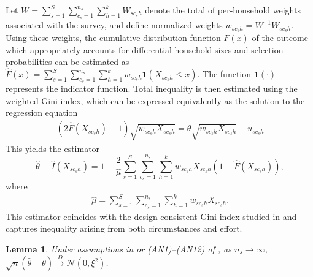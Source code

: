 \documentclass[12pt]{article}
\theoremstyle{plain}
\newtheorem{lemma}{Lemma}
\theoremstyle{definition}
\begin{document}
Let $W=\sum_{s=1}^{S}\sum_{c_s=1}^{n_s}\sum_{h=1}^{k}W_{sc_sh}$
denote the total of per-household weights associated with the survey, and define normalized weights $w_{sc_sh}=W^{-1}W_{sc_sh}$. Using these weights, the cumulative distribution function $F(x)$ of the outcome which appropriately accounts for differential household sizes and selection probabilities can be estimated as $\hat{F}\left(x\right) = \sum_{s=1}^{S} \sum_{c_s=1}^{n_s} \sum_{h=1}^{k}
w_{sc_sh}\mathbf{1}\left(X_{sc_sh}\leq x\right)$. The function $\mathbf{1}(\cdot)$ represents the indicator function.
Total inequality is then estimated using the weighted Gini index, which can be expressed equivalently as the solution to the regression equation
\begin{align}
    (2\hat{F}(X_{sc_sh})-1)\sqrt{w_{sc_sh}X_{sc_sh}}=\theta \sqrt{w_{sc_sh}X_{sc_sh}}+u_{sc_sh}
\end{align}
This yields the estimator
\begin{equation}
\hat{\theta}\equiv \hat{I}({X}_{sc_sh}) = 1 - \frac{2}{\hat{\mu}} \sum_{s=1}^{S} \sum_{c_s=1}^{n_s} 
\sum_{h=1}^{k} w_{sc_sh}X_{sc_sh} \left( 1 - \hat{F}\left(X_{sc_sh}\right)\right),
\label{eq:GiniIndexEst}
\end{equation} 
where
\begin{align}
\hat{\mu}=\sum_{s=1}^{S}\sum_{c_s=1}^{n_s}\sum_{h=1}^{k}w_{sc_sh}X_{sc_sh}.    
\end{align}
This estimator coincides with the design-consistent Gini index studied in \cite{bilson2020gini} and captures inequality arising from both circumstances and effort.
\begin{lemma}
\label{lem:clt_theta}
Under assumptions in \cite{Bhattacharya2007} or (AN1)--(AN12) of \cite{shivam2026asymptotic}, as $n_s\to\infty$,
$\sqrt n(\hat\theta-\theta)\xrightarrow{D}\mathcal N(0,\xi^2)$.
\end{lemma}
\end{document}
